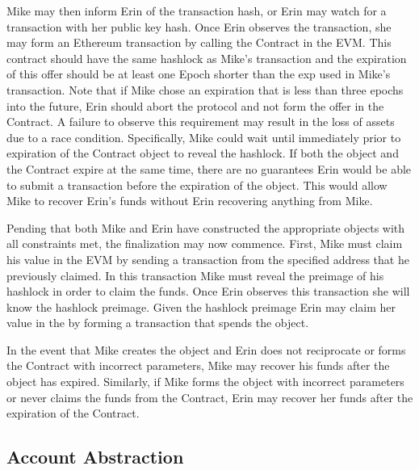 Mike may then inform Erin of the transaction hash, or Erin may watch
for a transaction with her public key hash.
Once Erin observes the transaction, she may form an Ethereum
transaction by calling the \AtomicSwap{}Contract in the EVM.
This contract should have the same hashlock as Mike's transaction and
the expiration of this offer should be at least one Epoch shorter than
the exp used in Mike's transaction.
Note that if Mike chose an expiration that is less than three epochs
into the future, Erin should abort the protocol and not form the offer
in the \AtomicSwap{}Contract.
A failure to observe this requirement may result in the loss of assets
due to a race condition.
Specifically, Mike could wait until immediately prior to expiration of
the \AtomicSwap{}Contract object to reveal the hashlock.
If both the \AtomicSwap{} object and the \AtomicSwap{}Contract expire at the
same time, there are no guarantees Erin would be able to submit a
transaction before the expiration of the \AtomicSwap{} object.
This would allow Mike to recover Erin's funds without Erin recovering
anything from Mike.

Pending that both Mike and Erin have constructed the appropriate
objects with all constraints met, the finalization may now commence.
First, Mike must claim his value in the EVM by sending a transaction
from the specified address that he previously claimed.
In this transaction Mike must reveal the preimage of his hashlock in
order to claim the funds.
Once Erin observes this transaction she will know the hashlock preimage.
Given the hashlock preimage Erin may claim her value in the \LayerTwo{}
by forming a transaction that spends the \AtomicSwap{} object.

In the event that Mike creates the \AtomicSwap{} object and Erin does not
reciprocate or forms the \AtomicSwap{}Contract with incorrect parameters,
Mike may recover his funds after the \AtomicSwap{} object has expired.
Similarly, if Mike forms the \AtomicSwap{} object with incorrect
parameters or never claims the funds from the \AtomicSwap{}Contract, Erin
may recover her funds after the expiration of the \AtomicSwap{}Contract.


\subsection{Account Abstraction}

